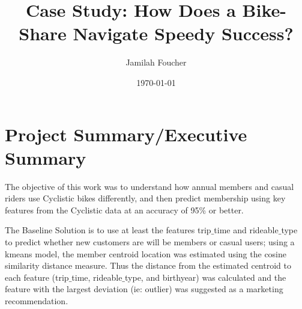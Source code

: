 \documentclass[11pt, onecolumn]{article}
\title{Case Study: How Does a Bike-Share Navigate Speedy Success?}	%
\author{Jamilah Foucher \\	%
}
\date{\today}	%
\begin{document}

\maketitle		%

\thispagestyle{empty}	%




\newpage				%

\tableofcontents		        %

\newpage				%



\section{Project Summary/Executive Summary}

The objective of this work was to understand how annual members and casual riders use Cyclistic bikes diﬀerently, and then predict membership using key features from the Cyclistic data at an accuracy of 95\% or better. 

The Baseline Solution is to use at least the features trip$\_$time and rideable$\_$type to predict whether new customers are will be members or casual users; using a kmeans model, the member centroid location was estimated using the cosine similarity distance measure. Thus the distance from the estimated centroid to each feature (trip$\_$time, rideable$\_$type, and birthyear) was calculated and the feature with the largest deviation (ie: outlier) was suggested as a marketing recommendation.  
\end{document}

